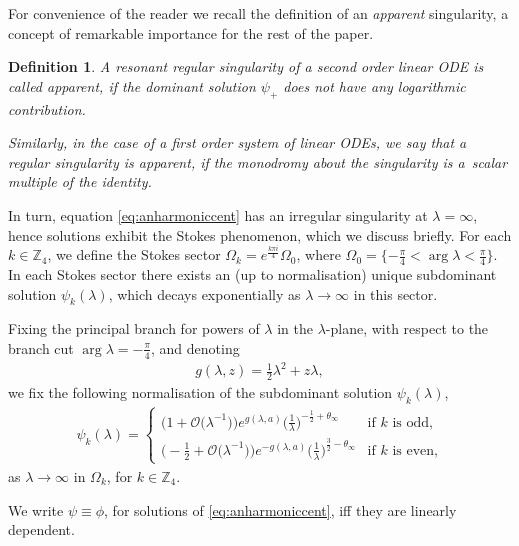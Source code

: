 \documentclass[pdftex]{sigma}
\numberwithin{equation}{section}
\newtheorem{Def}[thm]{Definition}
\newcommand{\bb}[1]{\mathbb{ #1 }}
\newcommand{\la}{\lambda}
\begin{document}
For convenience of the reader we recall the def\/inition of an \textit{apparent} singularity, a concept of remarkable importance for the rest of the paper.
\begin{Def}A resonant regular singularity of a second order linear ODE is called apparent, if the dominant solution $\psi_+$ does not have any logarithmic
contribution.

Similarly, in the case of a f\/irst order system of linear ODEs, we say that a regular singularity is apparent, if the monodromy about the singularity is a~scalar multiple of the identity.
\end{Def}

In turn, equation \eqref{eq:anharmoniccent} has an irregular singularity at $\lambda=\infty$, hence solutions exhibit the Stokes phenomenon, which we discuss brief\/ly. For each $k \in \bb{Z}_4$, we def\/ine the Stokes sector $\Omega_k=e^{\frac{k\pi i}{4}}\Omega_0$, where $\Omega_0=\{ - \frac{\pi}{4} < \arg{\lambda} <\frac{\pi}{4}\}$. In each Stokes sector there exists an (up to normalisation) unique subdominant solution $\psi_k(\lambda)$, which decays exponentially as $\lambda\rightarrow \infty$ in this sector.

Fixing the principal branch for powers of $\lambda$ in the $\lambda$-plane, with respect to the branch cut $\arg{\lambda}=-\frac{\pi}{4}$, and denoting
\begin{gather}\label{eq:gfunction}
g(\lambda,z)=\tfrac{1}{2}\lambda^2+z \lambda ,
\end{gather}
we f\/ix the following normalisation of the subdominant solution $\psi_k(\la)$,
\begin{gather} \label{eq:1psikscalar}
\psi_{k}(\lambda)=\begin{cases}
\big(1+\mathcal{O}\big(\lambda^{-1}\big)\big)e^{g(\lambda,a)}\big(\frac{1}{\lambda}\big)^{-\tfrac{1}{2}+\theta_\infty} & \text{if $k$ is odd,}\\
\big({-}\frac{1}{2}+\mathcal{O}\big(\lambda^{-1}\big)\big)e^{-g(\lambda,a)}\big(\frac{1}{\lambda}\big)^{\tfrac{3}{2}-\theta_\infty} & \text{if $k$ is even,}
\end{cases}
\end{gather}
as $\lambda\rightarrow \infty$ in $\Omega_k$, for $k\in\mathbb{Z}_4$.

We write $\psi\equiv \phi$, for solutions of \eqref{eq:anharmoniccent}, if\/f they are linearly dependent.
\end{document}
